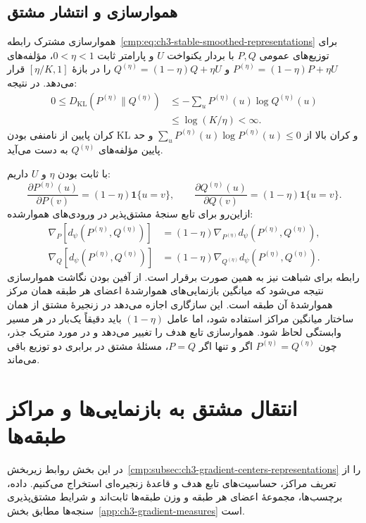 \subsection{هموارسازی و انتشار مشتق}
\label{app:ch3-gradient-measures-smoothing}

هموارسازی مشترک
رابطه~\eqref{cmp:eq:ch3-stable-smoothed-representations}
برای توزیع‌های عمومی $P,Q$ با بردار یکنواخت
$U$ و پارامتر ثابت $0<\eta<1$، مؤلفه‌های
$P^{(\eta)}=(1-\eta)P+\eta U$ و
$Q^{(\eta)}=(1-\eta)Q+\eta U$ را در
بازهٔ $[\eta/K,1]$ قرار می‌دهد.
در نتیجه:
\[
\begin{aligned}
0\le D_{\mathrm{KL}}(P^{(\eta)}\|Q^{(\eta)})
&\le-\sum_u P^{(\eta)}(u)\log Q^{(\eta)}(u)\\
&\le\log(K/\eta)<\infty.
\end{aligned}
\]
کران پایین از نامنفی بودن KL و کران بالا
از $\sum_u P^{(\eta)}(u)\log P^{(\eta)}(u)\le0$
و حد پایین مؤلفه‌های $Q^{(\eta)}$ به دست می‌آید.

با ثابت بودن $\eta$ و $U$ داریم:
\[
\frac{\partial P^{(\eta)}(u)}{\partial P(v)}
=(1-\eta)\mathbf1\{u=v\},
\qquad
\frac{\partial Q^{(\eta)}(u)}{\partial Q(v)}
=(1-\eta)\mathbf1\{u=v\}.
\]
ازاین‌رو برای تابع سنجهٔ مشتق‌پذیر در
ورودی‌های هموارشده:
\[
\begin{aligned}
\nabla_P[d_\psi(P^{(\eta)},Q^{(\eta)})]
&=(1-\eta)\nabla_{P^{(\eta)}}d_\psi(P^{(\eta)},Q^{(\eta)}),\\
\nabla_Q[d_\psi(P^{(\eta)},Q^{(\eta)})]
&=(1-\eta)\nabla_{Q^{(\eta)}}d_\psi(P^{(\eta)},Q^{(\eta)}).
\end{aligned}
\]
رابطه برای شباهت نیز به همین صورت برقرار
است. از آفین بودن نگاشت هموارسازی نتیجه
می‌شود که میانگین بازنمایی‌های هموارشدهٔ
اعضای هر طبقه همان مرکز هموارشدهٔ آن طبقه
است. این سازگاری اجازه می‌دهد در زنجیرهٔ
مشتق از همان ساختار میانگین مراکز استفاده
شود، اما عامل $(1-\eta)$ باید دقیقاً یک‌بار
در هر مسیر وابستگی لحاظ شود. هموارسازی
تابع هدف را تغییر می‌دهد و در مورد متریک
جذر، چون
$P^{(\eta)}=Q^{(\eta)}$ اگر و تنها اگر $P=Q$،
مسئلهٔ مشتق در برابری دو توزیع باقی می‌ماند.

\section{انتقال مشتق به بازنمایی‌ها و مراکز طبقه‌ها}
\label{app:ch3-gradient-centers-representations}

در این بخش روابط
زیربخش~\ref{cmp:subsec:ch3-gradient-centers-representations}
را از تعریف مراکز، حساسیت‌های تابع هدف و
قاعدهٔ زنجیره‌ای استخراج می‌کنیم. داده، برچسب‌ها،
مجموعهٔ اعضای هر طبقه و وزن طبقه‌ها ثابت‌اند
و شرایط مشتق‌پذیری سنجه‌ها مطابق
بخش~\ref{app:ch3-gradient-measures} است.


